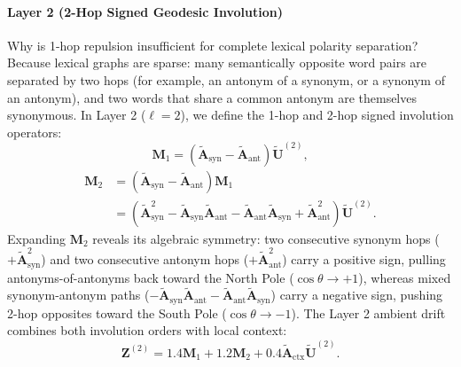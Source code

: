 \documentclass[journal]{IEEEtran}
\begin{document}
\paragraph{Layer 2 (2-Hop Signed Geodesic Involution)}
Why is 1-hop repulsion insufficient for complete lexical polarity separation? Because lexical graphs are sparse: many semantically opposite word pairs are separated by two hops (for example, an antonym of a synonym, or a synonym of an antonym), and two words that share a common antonym are themselves synonymous. In Layer 2 ($\ell = 2$), we define the 1-hop and 2-hop signed involution operators:
\begin{equation}
\mathbf{M}_1 = \left(\tilde{\mathbf{A}}_{\text{syn}} - \tilde{\mathbf{A}}_{\text{ant}}\right)\tilde{\mathbf{U}}^{(2)},
\label{eq:inv1}
\end{equation}
\begin{equation}
\begin{aligned}
\mathbf{M}_2 &= \left(\tilde{\mathbf{A}}_{\text{syn}} - \tilde{\mathbf{A}}_{\text{ant}}\right)\mathbf{M}_1 \\
&= \left(\tilde{\mathbf{A}}_{\text{syn}}^2 - \tilde{\mathbf{A}}_{\text{syn}}\tilde{\mathbf{A}}_{\text{ant}} - \tilde{\mathbf{A}}_{\text{ant}}\tilde{\mathbf{A}}_{\text{syn}} + \tilde{\mathbf{A}}_{\text{ant}}^2\right)\tilde{\mathbf{U}}^{(2)}.
\end{aligned}
\label{eq:inv2}
\end{equation}
Expanding $\mathbf{M}_2$ reveals its algebraic symmetry: two consecutive synonym hops ($+\tilde{\mathbf{A}}_{\text{syn}}^2$) and two consecutive antonym hops ($+\tilde{\mathbf{A}}_{\text{ant}}^2$) carry a positive sign, pulling antonyms-of-antonyms back toward the North Pole ($\cos\theta \to +1$), whereas mixed synonym-antonym paths ($-\tilde{\mathbf{A}}_{\text{syn}}\tilde{\mathbf{A}}_{\text{ant}} - \tilde{\mathbf{A}}_{\text{ant}}\tilde{\mathbf{A}}_{\text{syn}}$) carry a negative sign, pushing 2-hop opposites toward the South Pole ($\cos\theta \to -1$). The Layer 2 ambient drift combines both involution orders with local context:
\begin{equation}
\mathbf{Z}^{(2)} = 1.4\mathbf{M}_1 + 1.2\mathbf{M}_2 + 0.4\tilde{\mathbf{A}}_{\text{ctx}}\tilde{\mathbf{U}}^{(2)}.
\label{eq:layer2_drift}
\end{equation}
\end{document}

